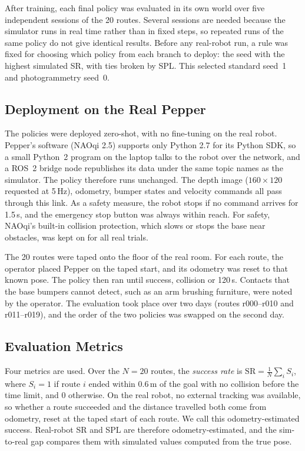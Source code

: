 After training, each final policy was evaluated in its own world over five independent sessions
of the 20 routes. Several sessions are needed because the simulator runs in real time rather
than in fixed steps, so repeated runs of the same policy do not give identical results. Before
any real-robot run, a rule was fixed for choosing which policy from each branch to deploy: the
seed with the highest simulated SR, with ties broken by SPL. This selected standard seed~1 and
photogrammetry seed~0.

\subsection{Deployment on the Real Pepper}
The policies were deployed zero-shot, with no fine-tuning on the real robot. Pepper's software
(NAOqi 2.5) supports only Python 2.7 for its Python SDK, so a small Python~2 program on the laptop
talks to the robot over the network, and a ROS~2 bridge node republishes its data under the same
topic names as the simulator. The policy therefore runs unchanged. The depth image ($160\times120$
requested at 5\,Hz), odometry, bumper states and velocity commands all pass through this link. As a
safety measure, the robot stops if no command arrives for 1.5\,s, and the emergency stop button was
always within reach. For safety, NAOqi's built-in collision protection, which slows or stops the
base near obstacles, was kept on for all real trials.

The 20 routes were taped onto the floor of the real room. For each route, the operator placed Pepper
on the taped start, and its odometry was reset to that known pose. The policy then ran until
success, collision or 120\,s. Contacts that the base bumpers cannot detect, such as an arm brushing
furniture, were noted by the operator. The evaluation took place over two days (routes r000--r010
and r011--r019), and the order of the two policies was swapped on the second day.

\subsection{Evaluation Metrics}
Four metrics are used. Over the $N=20$ routes, the \emph{success rate} is
$\mathrm{SR}=\frac{1}{N}\sum_i S_i$, where $S_i=1$ if route $i$ ended within 0.6\,m of the goal with
no collision before the time limit, and 0 otherwise. On the real robot, no external tracking was
available, so whether a route succeeded and the distance travelled both come from odometry, reset at
the taped start of each route. We call this odometry-estimated success. Real-robot SR and SPL are
therefore odometry-estimated, and the sim-to-real gap compares them with simulated values computed
from the true pose.


